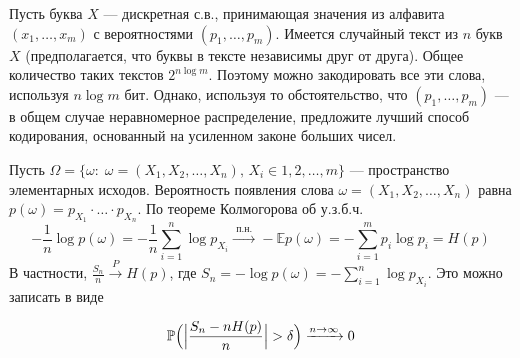 \begin{comment}
\begin{problem} \textit{Асимптотическая равнораспределенность.}
Доказать, что:
\begin{enumerate}
\item Множество типичных слов ограничено: $|T_{\delta}^{(n)}| \leq 2^{n(H(X) + \delta)}$;
\item $|T_{\delta}^{(n)}| \geq (1-\epsilon)2^{n(H(X) + \delta})$ для достаточно больших $n$;
\item вероятность того, что $w$ - нетипично: $\mathbb{P}\{w \neq T_{\delta}^{(n)} \} \leq \epsilon$.
\end{enumerate}
\end{problem}

\begin{remark} Идея о типичных последовательностях лежит в основе кодирования. Например, $\delta$-типичные $n$-буквенные слова кодируются при помощи двоичных последовательностей длины $n(H(X) + \delta)$, нетипичные отбрасываются или представляются одним и тем же добавочным символом. Очевидно, что при декодировании (восстановлении) вероятность ошибки не превысит $\epsilon$.
\end{remark}

\begin{problem} Рассмотрите связь между доказательством принципа асимптотической равнораспределенности и эквивалентностью (для больших систем)энтропий Больцмана и Гиббса.
\end{problem}
\end{comment}

\begin{problem}
Пусть буква $X$ --- дискретная с.в., принимающая значения из алфавита $(x_1,\ldots,x_m)$ с вероятностями $(p_1,\ldots,p_m)$. 
Имеется случайный текст из $n$ букв $X$ (предполагается, что буквы в тексте независимы друг от друга). Общее количество таких 
текстов $2^{n\log m}$. Поэтому можно закодировать все эти слова, используя $n\log m$ бит. Однако, используя то обстоятельство, что 
$(p_1,\ldots,p_m)$ --- в общем случае неравномерное распределение, предложите лучший способ кодирования, основанный 
на усиленном законе больших чисел.
\end{problem}

\begin{ordre}
Пусть $\Omega=\{ \omega:\; \omega=(X_1,X_2,\ldots, X_n),\, X_i\in 1,2,\ldots,m\}$ --- пространство элементарных исходов. 
Вероятность появления слова $\omega=(X_1,X_2,\ldots, X_n)$ равна $p(\omega)=p_{X_1}\cdot\ldots\cdot p_{X_n}$. По теореме Колмогорова об 
у.з.б.ч. 
$$
-\frac{1}{n}\log p(\omega)=-\frac{1}{n}\sum\limits_{i=1}^{n}\log p_{X_i} \xrightarrow{\text{ п.н. }} 
-{\mathbb E}p(\omega)=-\sum\limits_{i=1}^{m}p_i\log p_i=H(p) 
$$
В частности, $\frac{S_n}{n}\xrightarrow{P}H(p)$, где $S_n=-\log p(\omega)=-\sum\limits_{i=1}^{n}\log p_{X_i}$. Это можно записать в виде 

$$
{\mathbb P}\Bigl( \Bigl| \frac{S_n-nH(p)}{n}\Bigr|>\delta \Bigr)  \xrightarrow{n\to\infty} 0 
$$
\end{ordre}

